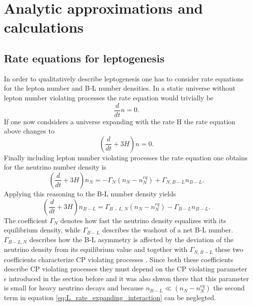  \chapter{Analytic approximations and calculations}
 
\section{Rate equations for leptogenesis}
In order to qualitatively describe leptogenesis one has to consider rate equations for the lepton number and B-L number densities. In a static universe without lepton number violating processes the rate equation would trivially be
\begin{equation}
	\frac{d}{dt}n=0.
	\label{eq:rate_static_nointeraction}
\end{equation}
If one now condsiders a universe expanding with the rate H the rate equation above changes to
\begin{equation}
\left(\frac{d}{dt}+3H\right)n=0.
\label{eq:rate_expanding_nointeraction}
\end{equation}
Finally including lepton number violating processes the rate equation one obtains for the neutrino number density is
\begin{equation}
\left(\frac{d}{dt}+3H\right)n_N=-\Gamma_N\left(n_N-n_N^{eq}\right)+\Gamma_{N,B-L}n_{B-L}.
\label{eq:L_rate_expanding_interaction}
\end{equation}
Applying this reasoning to the B-L number density yields
\begin{equation}
\left(\frac{d}{dt}+3H\right)n_{B-L}=\Gamma_{B-L,N}\left(n_N-n_N^{eq}\right)-\Gamma_{B-L}n_{B-L}.
\label{eq:B-L_rate_expanding_interaction}
\end{equation}
The coefficient $\Gamma_N$ denotes how fast the neutrino density equalizes with its equilibrium density, while $\Gamma_{B-L}$ describes the washout of a net B-L number. $\Gamma_{B-L,N}$ describes how the B-L asymmetry is affected by the deviation of the neutrino density from its equilibrium value and together with $\Gamma_{N,B-L}$ these two coefficients characterize CP violating processes \cite[p. 4]{Bodeker:2013qaa}. Since both these coefficients describe CP violating processes they must depend on the CP violating parameter $\epsilon$ introduced in the section before and it was also shwon there that this parameter is small for heavy neutrino decays and because $n_{B-L}\ll\left(n_N-n_N^{eq}\right)$ the second term in equation \eqref{eq:L_rate_expanding_interaction} can be neglegted. \newline\indent
